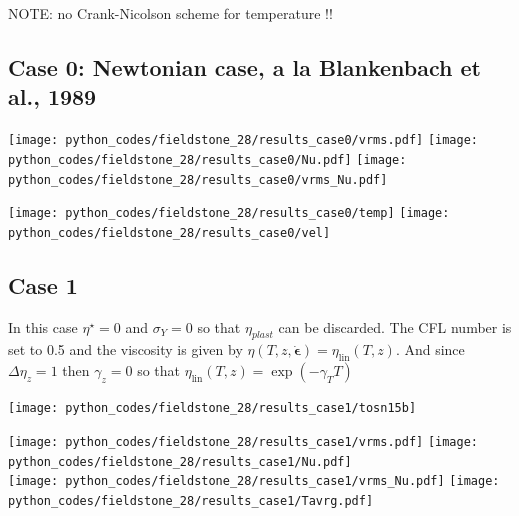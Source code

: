 NOTE: no Crank-Nicolson scheme for temperature !!

\newpage 
\subsection*{Case 0: Newtonian case, a la Blankenbach et al., 1989}

\begin{center}
\texttt{[image: python\_codes/fieldstone\_28/results\_case0/vrms.pdf]}
\texttt{[image: python\_codes/fieldstone\_28/results\_case0/Nu.pdf]}
\texttt{[image: python\_codes/fieldstone\_28/results\_case0/vrms\_Nu.pdf]}
\end{center}

\begin{center}
\texttt{[image: python\_codes/fieldstone\_28/results\_case0/temp]}
\texttt{[image: python\_codes/fieldstone\_28/results\_case0/vel]}
\end{center}



\newpage 
\subsection*{Case 1}

In this case $\eta^\star=0$ and $\sigma_Y=0$ so that $\eta_{plast}$ can be discarded.
The CFL number is set to 0.5 and the viscosity is given by 
$\eta(T,z,\dot{\boldsymbol{\epsilon}}) =   \eta_\text{lin}(T,z) $.
And since $\Delta \eta_z=1$ then $\gamma_z=0$ so that
$\eta_\text{lin} (T,z) = \exp(-\gamma_T T )$

\begin{center}
\texttt{[image: python\_codes/fieldstone\_28/results\_case1/tosn15b]}
\end{center}

\begin{center}
\texttt{[image: python\_codes/fieldstone\_28/results\_case1/vrms.pdf]}
\texttt{[image: python\_codes/fieldstone\_28/results\_case1/Nu.pdf]}\\
\texttt{[image: python\_codes/fieldstone\_28/results\_case1/vrms\_Nu.pdf]}
\texttt{[image: python\_codes/fieldstone\_28/results\_case1/Tavrg.pdf]}
\end{center}

